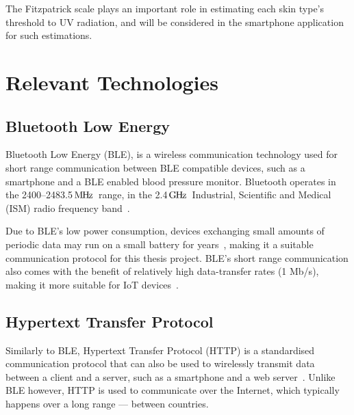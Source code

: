 \documentclass[12pt,openany,a4paper]{book}
\newcommand{\pack}	{\hspace{-0.08em}}
\newcommand{\MHz}	{\ensuremath{\rm\,M\pack H\pack z}}
\newcommand{\GHz}	{\ensuremath{\rm\,G\pack H\pack z}}
\begin{document}
The Fitzpatrick scale plays an important role in estimating each skin type's threshold to
UV radiation, and will be considered in the smartphone application for such
estimations.

\section{Relevant Technologies}

\subsection{Bluetooth Low Energy}

Bluetooth Low Energy (BLE), is a wireless communication technology used for
short range communication between BLE compatible devices, such as a smartphone
and a BLE enabled blood pressure monitor. Bluetooth operates in the
2400--2483.5\MHz\ range, in the 2.4\GHz\ Industrial, Scientific and Medical (ISM)
radio frequency band~\cite{ray_2015}.

Due to BLE's low power consumption, devices
exchanging small amounts of periodic data may run on a small battery for years~\cite{ray_2015},
making it a suitable communication protocol for this thesis project. BLE's short
range communication also comes with the benefit of relatively high data-transfer
rates (1 Mb/s), making it more suitable for IoT devices~\cite{ray_2015}.

\subsection{Hypertext Transfer Protocol}

Similarly to BLE, Hypertext Transfer Protocol (HTTP) is a standardised
communication protocol that can also be used to wirelessly transmit data between
a client and a server, such as a smartphone and a web server~\cite{W3schools}.
Unlike BLE however, HTTP is used to communicate over the Internet, which typically
happens over a long range --- between countries.
\end{document}
